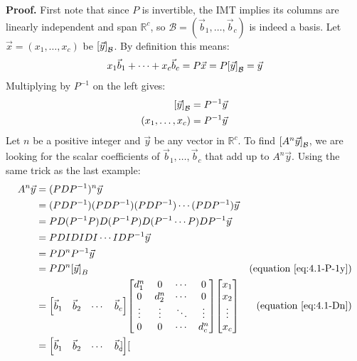 \documentclass[11pt, letterpaper]{report}
\newenvironment{book}{}{}
\let\originalleft\left
\let\originalright\right
\renewcommand{\left}{\mathopen{}\mathclose\bgroup\originalleft}
\renewcommand{\right}{\aftergroup\egroup\originalright}
\newcounter{example}[section]
\newcommand{\R}{\mathbb{R}}
\begin{document}
\begin{book}
\textbf{Proof.} First note that since $P$ is invertible, the IMT implies its columns are linearly independent and span $\R^c$, so $\mathcal{B} = ( \vec{b}_1,\ldots,\vec{b}_c )$ is indeed a basis. Let $\vec{x} = (x_1,\ldots, x_c)$ be $\left[ \vec{y} \right]_{\mathcal{B}}$. By definition this means:
\[x_1\vec{b}_1 + \cdots + x_c\vec{b}_c =P\vec{x} = P\left[ \vec{y} \right]_{\mathcal{B}} = \vec{y}\]
Multiplying by $P^{-1}$ on the left gives:
\begin{align}\label{eq:4.1-P-1y}
\left[ \vec{y} \right]_{\mathcal{B}} &= P^{-1}\vec{y} \nonumber \\
(x_1,\ldots,x_c) &= P^{-1}\vec{y}
\end{align}
Let $n$ be a positive integer and $\vec{y}$ be any vector in $\R^{c}$. To find $\left[ A^n\vec{y} \right]_{\mathcal{B}}$, we are looking for the scalar coefficients of $\vec{b}_1,\ldots,\vec{b}_c$ that add up to $A^n\vec{y}$. Using the same trick as the last example:
\begin{align*}
A^n\vec{y} &= ( PDP^{-1} )^{n}\vec{y} \\
&= ( PDP^{-1} )( PDP^{-1} )( PDP^{-1} ) \cdots( PDP^{-1} )\vec{y} \\
&=PD ( P^{-1}P )D ( P^{-1}P ) D ( P^{-1} \cdots P )DP^{-1}\vec{y} \\
&= PDIDIDI\cdots IDP^{-1}\vec{y} \\
&= PD^nP^{-1}\vec{y} \\
&= PD^n \left[ \vec{y} \right]_B & \text{(equation \ref{eq:4.1-P-1y})} \\
&= \begin{bmatrix}
\vec{b}_1 & \vec{b}_2 & \cdots & \vec{b}_c
\end{bmatrix} \begin{bmatrix}
d_1^n & 0 & \cdots & 0 \\
0 & d_2^n & \cdots & 0 \\
\vdots & \vdots & \ddots & \vdots \\
0 & 0 & \cdots & d_c^n
\end{bmatrix} \begin{bmatrix}
x_1 \\ x_2 \\ \vdots \\ x_{c}
\end{bmatrix} & \text{(equation \ref{eq:4.1-Dn})}\\
&= \begin{bmatrix}
\vec{b}_1 & \vec{b}_2 & \cdots & \vec{b}_c
\end{bmatrix} \begin{bmatrix}

\end{bmatrix}
\end{align*}
\end{book}
\end{document}
